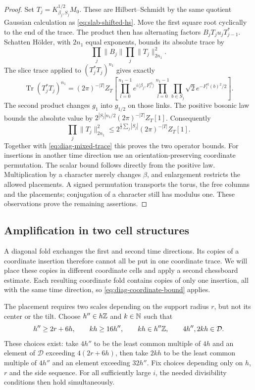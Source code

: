 \begin{proof}
Set $T_j=K_{\beta_j,S_j}^{1/2}M_0$. These are
Hilbert--Schmidt by the same quotient Gaussian calculation as
\eqref{eq:slab-shifted-hs}. Move the first square root cyclically
to the end of the trace. The product then has alternating factors
$B_jT_ju_jT_{j-1}^*$. Schatten H\"older, with $2n_1$ equal
exponents, bounds its absolute trace by
\[
 \prod_j\|B_j\|\prod_j\|T_j\|_{2n_1}^2.
\]
The slice trace applied to $(T_j^*T_j)^{n_1}$ gives exactly
\begin{equation}\label{eq:diag-variance-trace}
 \operatorname{Tr}(T_j^*T_j)^{n_1}
 =(2\pi)^{-|T|}Z_T\left[
    \prod_{l=0}^{n_1-1}e^{i\langle\beta_j,F_l^{\mathrm{el}}\rangle}
    \prod_{l=0}^{n_1-1}\prod_{b\in S_j}
                     \sqrt2e^{-F_l^{\mathrm{el}}(b)^2/2}\right].
\end{equation}
The second product changes $g_1$ into $g_{1/2}$ on those links.
The positive bosonic law bounds the absolute value by
$2^{|S_j|n_1/2}(2\pi)^{-|T|}Z_T[1]$. Consequently
\[
 \prod_j\|T_j\|_{2n_1}^2
 \le 2^{\frac12\sum_j|S_j|}(2\pi)^{-|T|}Z_T[1].
\]
Together with \eqref{eq:diag-mixed-trace} this proves the two
operator bounds. For insertions in another time direction use
an orientation-preserving coordinate permutation. The scalar
bound follows directly from the positive law. Multiplication by
a character merely changes $\beta$, and enlargement restricts
the allowed placements. A signed permutation transports the
torus, the free columns and the placements; conjugation of a
character still has modulus one. These observations prove the
remaining assertions.
\end{proof}

\subsection{Amplification in two cell structures}\label{subsec:diag-amplification}

A diagonal fold exchanges the first and second time directions.
Its copies of a coordinate insertion therefore cannot all be put
in one coordinate trace. We will place these copies in different
coordinate cells and apply a second chessboard estimate. Each
resulting coordinate fold contains copies of only one insertion,
all with the same time direction, so
\eqref{eq:diag-coordinate-bound} applies.

The placement requires two scales depending on the support radius
$r$, but not its center or the tilt. Choose $h''\in h\mathbb Z$ and
$k\in\mathbb N$ such that
\begin{equation}\label{eq:diag-coarse-widths}
 h''\ge2r+6h,\qquad kh\ge16h'',\qquad
 kh\in h''\mathbb Z,\qquad4h'',2kh\in\mathcal D.
\end{equation}
These choices exist: take $4h''$ to be the least common multiple
of $4h$ and an element of $\mathcal D$ exceeding $4(2r+6h)$,
then take $2kh$ to be the least common multiple of $4h''$ and an
element exceeding $32h''$. Fix choices depending only on $h$, $r$
and the side sequence. For all sufficiently large $i$, the needed
divisibility conditions then hold simultaneously.

